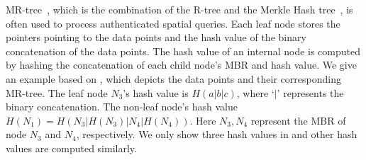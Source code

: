 MR-tree~\cite{10.1007/s00778-008-0113-2}, which is the combination of the R-tree and the Merkle Hash tree~\cite{10.1007/0-387-34805-0_21}, is often used to process authenticated spatial queries. Each leaf node stores the pointers pointing to the data points and the hash value of the binary concatenation of the data points. The hash value of an internal node is computed by hashing the concatenation of each child node's MBR and hash value. We give an example based on , which depicts the data points and their corresponding MR-tree. The leaf node $N_{3}$'s hash value is $H(a|b|c)$, where `$|$' represents the binary concatenation. The non-leaf node's hash value $H(N_{1})=H(N_{3}|H(N_{3})|N_{4}|H(N_{4}))$. Here $N_{3}, N_{4}$ represent the MBR of node $N_{3}$ and $N_{4}$, respectively. We only show three hash values in  and other hash values are computed similarly.

